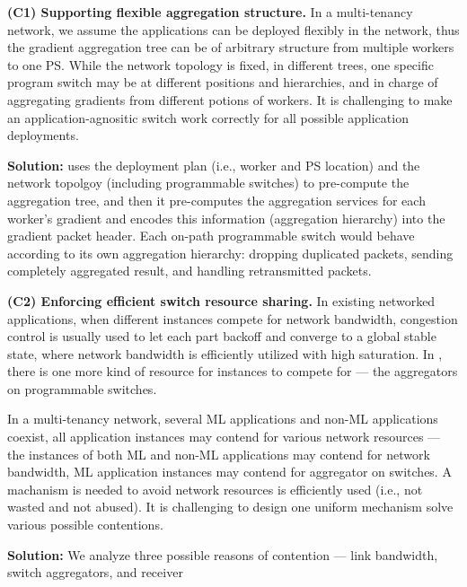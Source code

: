 \textbf{(C1) Supporting flexible aggregation structure.} In a multi-tenancy network, we assume the applications can be deployed flexibly in the network, thus the gradient aggregation tree can be of arbitrary structure from multiple workers to one PS. While the network topology is fixed, in different trees, one specific program switch may be at different positions and hierarchies, and in charge of aggregating gradients from different potions of workers. It is challenging to make an application-agnositic switch work correctly for all possible application deployments.

\textbf{Solution:} \sysname uses the deployment plan (i.e., worker and PS location) and the network topolgoy (including programmable switches) to pre-compute the aggregation tree, and then it pre-computes the aggregation services for each worker's gradient and encodes this information (aggregation hierarchy) into the gradient packet header. Each on-path programmable switch would behave according to its own aggregation hierarchy: dropping duplicated packets, sending completely aggregated result, and handling retransmitted packets.





\textbf{(C2) Enforcing efficient switch resource sharing.} In existing networked applications, when different instances compete for network bandwidth, congestion control is usually used to let each part backoff and converge to a global stable state, where network bandwidth is efficiently utilized with high saturation. In \sysname, there is one more kind of resource for \sysname instances to compete for --- the aggregators on programmable switches. 



In a multi-tenancy network, several ML applications and non-ML applications coexist, all application instances may contend for various network resources --- the instances of both ML and non-ML applications may contend for network bandwidth, ML application instances may contend for aggregator on switches. A machanism is needed to avoid network resources is efficiently used (i.e., not wasted and not abused). It is challenging to design one uniform mechanism solve various possible contentions.

\textbf{Solution:} We analyze three possible reasons of contention --- link bandwidth, switch aggregators, and receiver 





